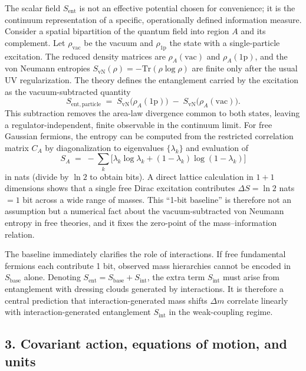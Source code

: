 \documentclass[11pt]{article}
\begin{document}
The scalar field $S_{\mathrm{ent}}$ is not an effective potential chosen for convenience; it is the continuum representation of a specific, operationally defined information measure. Consider a spatial bipartition of the quantum field into region $A$ and its complement. Let $\rho_{\mathrm{vac}}$ be the vacuum and $\rho_{\mathrm{1p}}$ the state with a single-particle excitation. The reduced density matrices are $\rho_A(\mathrm{vac})$ and $\rho_A(\mathrm{1p})$, and the von Neumann entropies $S_{\mathrm{vN}}(\rho) = -\mathrm{Tr}(\rho \log \rho)$ are finite only after the usual UV regularization. The theory defines the entanglement carried by the excitation as the vacuum-subtracted quantity
\[
S_{\mathrm{ent,particle}} \;=\; S_{\mathrm{vN}}\!\big(\rho_A(\mathrm{1p})\big) \;-\; S_{\mathrm{vN}}\!\big(\rho_A(\mathrm{vac})\big).
\]
This subtraction removes the area-law divergence common to both states, leaving a regulator-independent, finite observable in the continuum limit. For free Gaussian fermions, the entropy can be computed from the restricted correlation matrix $C_A$ by diagonalization to eigenvalues $\{\lambda_k\}$ and evaluation of
\[
S_A \;=\; -\sum_k \big[\lambda_k \log \lambda_k + (1-\lambda_k)\log(1-\lambda_k)\big]
\]
in nats (divide by $\ln 2$ to obtain bits). A direct lattice calculation in $1{+}1$ dimensions shows that a single free Dirac excitation contributes $\Delta S = \ln 2$ nats $= 1$ bit across a wide range of masses. This “1-bit baseline” is therefore not an assumption but a numerical fact about the vacuum-subtracted von Neumann entropy in free theories, and it fixes the zero-point of the mass–information relation.

The baseline immediately clarifies the role of interactions. If free fundamental fermions each contribute 1 bit, observed mass hierarchies cannot be encoded in $S_{\mathrm{base}}$ alone. Denoting $S_{\mathrm{ent}} = S_{\mathrm{base}} + S_{\mathrm{int}}$, the extra term $S_{\mathrm{int}}$ must arise from entanglement with dressing clouds generated by interactions. It is therefore a central prediction that interaction-generated mass shifts $\Delta m$ correlate linearly with interaction-generated entanglement $S_{\mathrm{int}}$ in the weak-coupling regime.

\subsection*{3. Covariant action, equations of motion, and units}
\end{document}
